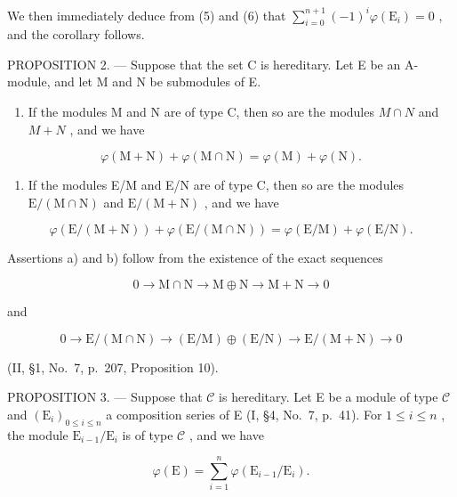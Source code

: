 We then immediately deduce from (5) and (6) that \(\sum_{i=0}^{n+1}(-1)^{i}\varphi(\mathrm{E}_{i}) = 0\) , and the corollary follows.

PROPOSITION 2. --- Suppose that the set C is hereditary. Let E be an A-module, and let M and N be submodules of E.

\begin{enumerate}
\def\labelenumi{\alph{enumi})}
\tightlist
\item
  If the modules M and N are of type C, then so are the modules \(M \cap N\) and \(M + N\) , and we have
\end{enumerate}

\[
\varphi (\mathrm{M} + \mathrm{N}) + \varphi (\mathrm{M} \cap \mathrm{N}) = \varphi (\mathrm{M}) + \varphi (\mathrm{N}).
\]

\begin{enumerate}
\def\labelenumi{\alph{enumi})}
\setcounter{enumi}{1}
\tightlist
\item
  If the modules E/M and E/N are of type C, then so are the modules \(\mathrm{E}/(\mathrm{M}\cap\mathrm{N})\) and \(\mathrm{E}/(\mathrm{M}+\mathrm{N})\) , and we have
\end{enumerate}

\[
\varphi (\mathrm{E} / (\mathrm{M} + \mathrm{N})) + \varphi (\mathrm{E} / (\mathrm{M} \cap \mathrm{N})) = \varphi (\mathrm{E} / \mathrm{M}) + \varphi (\mathrm{E} / \mathrm{N}).
\]

Assertions a) and b) follow from the existence of the exact sequences

\[
0 \to \mathrm{M} \cap \mathrm{N} \to \mathrm{M} \oplus \mathrm{N} \to \mathrm{M} + \mathrm{N} \to 0
\]

and

\[
0 \to \mathrm{E} / (\mathrm{M} \cap \mathrm{N}) \to (\mathrm{E} / \mathrm{M}) \oplus (\mathrm{E} / \mathrm{N}) \to \mathrm{E} / (\mathrm{M} + \mathrm{N}) \to 0
\]

(II, §1, No.~7, p.~207, Proposition 10).

PROPOSITION 3. --- Suppose that \(\mathcal{C}\) is hereditary. Let E be a module of type \(\mathcal{C}\) and \((\mathrm{E}_i)_{0\leqslant i\leqslant n}\) a composition series of E (I, §4, No.~7, p.~41). For \(1\leqslant i\leqslant n\) , the module \(\mathrm{E}_{i - 1} / \mathrm{E}_i\) is of type \(\mathcal{C}\) , and we have

\[
\varphi (\mathrm{E}) = \sum_ {i = 1} ^ {n} \varphi (\mathrm{E} _ {i - 1} / \mathrm{E} _ {i}).
\]

